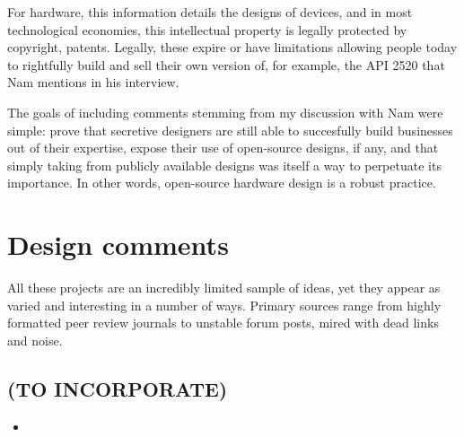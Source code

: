 For hardware, this information details the designs of devices, and in most technological economies, this intellectual property is legally protected by copyright, patents. Legally, these expire or have limitations allowing people today to rightfully build and sell their own version of, for example, the API 2520 that Nam mentions in his interview. 

The goals of including comments stemming from my discussion with Nam were simple: prove that secretive designers are still able to succesfully build businesses out of their expertise, expose their use of open-source designs, if any, and that simply taking from publicly available designs was itself a way to perpetuate its importance. In other words, open-source hardware design is a robust practice. 

\section{Design comments}

All these projects are an incredibly limited sample of ideas, yet they appear as varied and interesting in a number of ways. Primary sources range from highly formatted peer review journals to unstable forum posts, mired with dead links and noise.  



\begin{unsortedStuff}	
\section*{(TO INCORPORATE)}
	\begin{itemize}
		\item 
	\end{itemize}
\end{unsortedStuff}
		
\begin{optBlankSpace}
	\newpage
	\mbox{}
\end{optBlankSpace}

